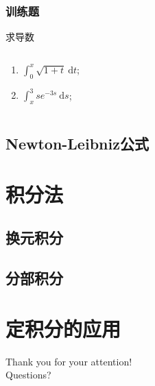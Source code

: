 \documentclass[
10pt,
aspectratio=43,
]{beamer}
\begin{document}
\begin{frame}
	\frametitle{训练题}
	\everymath{\displaystyle}
	\begin{block}{求导数}
		\begin{columns}
			\begin{column}{0.5\textwidth}
				\begin{enumerate}
					\item $\int_0^x\sqrt{1+t}\mathrm{~d}t$;
					\item $\int_{x}^3se^{-3s}\mathrm{~d}s$;
				\end{enumerate}
			\end{column}
			\begin{column}{0.5\textwidth}
				
			\end{column}
		\end{columns}
	\end{block}
\end{frame}
\subsection{Newton-Leibniz公式}
\section{积分法}
\subsection{换元积分}
\subsection{分部积分}
\section{定积分的应用}

\begin{frame}[plain]
	\vfill
	\centering
	{
		\centering \Huge \color{white} Thank you for your attention!\\[10pt]Questions?
	}
	\vfill
\end{frame}
\end{document}
